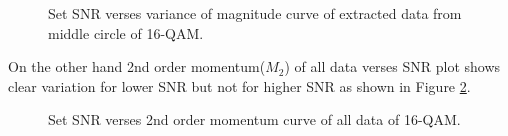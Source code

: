 \documentclass[12pt]{report}
\begin{document}
\begin{figure}[htbp]
	\caption{Set SNR verses variance of magnitude curve of extracted data from middle circle of 16-QAM.}
	\label{fig:mmsVsSNR}
\end{figure}

 On the other hand 2nd order momentum($M_2$) of all data verses SNR plot shows clear variation for lower SNR but not for higher SNR as shown in Figure \ref{fig:m2sVsSNR}.  
\begin{figure}[htbp]
	\caption{Set SNR verses 2nd order momentum curve of all data of 16-QAM.}
	\label{fig:m2sVsSNR}
\end{figure}
\end{document}
